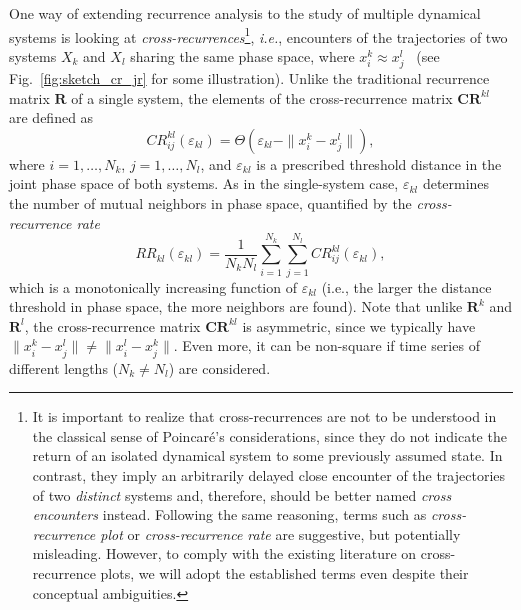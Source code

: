 \documentclass[graybox]{svmult}
\begin{document}
One way of extending recurrence analysis to the study of multiple dynamical systems is looking at \emph{cross-recurrences}\footnote{It is important to realize that cross-recurrences are not to be understood in the classical sense of Poincar{\'e}'s considerations, since they do not indicate the return of an isolated dynamical system to some previously assumed state. In contrast, they imply an arbitrarily delayed close encounter of the trajectories of two \emph{distinct} systems and, therefore, should be better named \emph{cross encounters} instead. Following the same reasoning, terms such as \emph{cross-recurrence plot} or \emph{cross-recurrence rate} are suggestive, but potentially misleading. However, to comply with the existing literature on cross-recurrence plots, we will adopt the established terms even despite their conceptual ambiguities.}, \textit{i.e.}, encounters of the trajectories of two systems $X_k$ and $X_l$ sharing the same phase space, where $x_i^k \approx x_j^l$~\cite{Marwan2002PLA,Zbilut1998} (see Fig.~\ref{fig:sketch_cr_jr} for some illustration). Unlike the traditional recurrence matrix $\mathbf{R}$ of a single system, the elements of the cross-recurrence matrix $\mathbf{CR}^{kl}$ are defined as
\begin{equation}
CR_{ij}^{kl}(\varepsilon_{kl})=\Theta(\varepsilon_{kl} - \|x_i^k - x_j^l\|),
\end{equation}
where $i=1,\dots,N_k$, $j=1,\dots,N_l$, and $\varepsilon_{kl}$ is a prescribed threshold distance in the joint phase space of both systems. As in the single-system case, $\varepsilon_{kl}$ determines the number of mutual neighbors in phase space, quantified by the \emph{cross-recurrence rate}
\begin{equation}
RR_{kl}(\varepsilon_{kl})=\frac{1}{N_k N_l}\sum_{i=1}^{N_k} \sum_{j=1}^{N_l} CR_{ij}^{kl}(\varepsilon_{kl}),
\label{eq:crr}
\end{equation}
\noindent
which is a monotonically increasing function of $\varepsilon_{kl}$ (i.e., the larger the distance threshold in phase space, the more neighbors are found). Note that unlike $\mathbf{R}^k$ and $\mathbf{R}^l$, the cross-recurrence matrix $\mathbf{CR}^{kl}$ is asymmetric, since we typically have $\|x_i^k - x_j^l\|\neq\|x_i^l - x_j^k\|$. Even more, it can be non-square if time series of different lengths ($N_k\neq N_l$) are considered.
\end{document}
